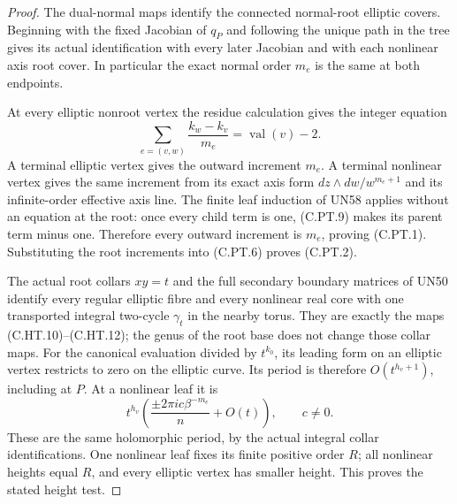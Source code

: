 \begin{proof}
The dual-normal maps identify the connected
normal-root elliptic covers. Beginning with
the fixed Jacobian of $q_P$ and following the
unique path in the tree gives its actual
identification with every later Jacobian and
with each nonlinear axis root cover. In
particular the exact normal order $m_e$ is
the same at both endpoints.

At every elliptic nonroot vertex the residue
calculation gives the integer equation
\[
 \sum_{e=(v,w)}
       \frac{k_w-k_v}{m_e}
                        =\operatorname{val}(v)-2.
 \tag{C.PT.9}
\]
A terminal elliptic vertex gives the outward
increment $m_e$. A terminal nonlinear vertex
gives the same increment from its exact
axis form $dz\wedge dw/w^{m_e+1}$ and its
infinite-order effective axis line.
The finite leaf induction of UN58 applies
without an equation at the root: once every
child term is one, (C.PT.9) makes its parent
term minus one. Therefore every outward
increment is $m_e$, proving (C.PT.1).
Substituting the root increments into
(C.PT.6) proves (C.PT.2).

The actual root collars $xy=t$ and the full
secondary boundary matrices of UN50 identify
every regular elliptic fibre and every
nonlinear real core with one transported
integral two-cycle $\gamma_t$ in the nearby
torus. They are exactly the maps
(C.HT.10)--(C.HT.12); the genus of the root
base does not change those collar maps.
For the canonical evaluation divided by
$t^{k_0}$, its leading form on an elliptic
vertex restricts to zero on the elliptic
curve. Its period is therefore
$O(t^{h_v+1})$, including at $P$.
At a nonlinear leaf it is
\[
 t^{h_v}
       \left(\frac{\pm2\pi i c\beta^{-m_e}}{n}
                         +O(t)\right),\qquad c\ne0.
 \tag{C.PT.10}
\]
These are the same holomorphic period, by the
actual integral collar identifications.
One nonlinear leaf fixes its finite positive
order $R$; all nonlinear heights equal $R$,
and every elliptic vertex has smaller height.
This proves the stated height test.


\end{proof}
